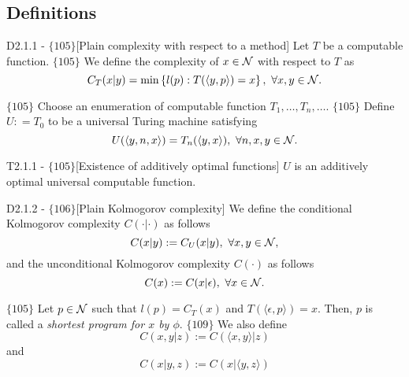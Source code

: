 \documentclass{article}
\begin{document}
\subsection{Definitions}

\begin{flexidefinition}{D2.1.1 - $\{105\}$}[Plain complexity with respect to a method]
    Let $T$ be a computable function. $\{105\}$ We define the complexity of $x \in \mathcal{N}$ with respect to $T$ as
\begin{equation}
    C_T(x|y) = \min \left\{l(p) : T(\langle y, p \rangle) = x \right\},  \ \forall x,y \in \mathcal{N}.
\end{equation}
\end{flexidefinition}

$\{105\}$ Choose an enumeration of computable function $T_1, \ldots, T_n, \ldots$. $\{105\}$ Define $U: =T_0$ to be a universal Turing machine satisfying
\begin{equation}
    U(\langle y, n, x \rangle) = T_n(\langle y, x \rangle), \ \forall n,x,y \in \mathcal{N}. 
\end{equation}

\begin{flexitheorem}{T2.1.1 - $\{105\}$}[Existence of additively optimal functions]
    $U$ is an additively optimal universal computable function.
\end{flexitheorem}

\begin{flexidefinition}{D2.1.2 - $\{106\}$}[Plain Kolmogorov complexity]
    We define the conditional Kolmogorov complexity $C(\cdot | \cdot)$ as follows 
    \begin{equation}
        C(x|y) := C_U(x|y), \  \forall x,y \in \mathcal{N},
    \end{equation}
    and the unconditional Kolmogorov complexity $C(\cdot)$ as follows
    \begin{equation}
        C(x) := C(x|\epsilon),  \ \forall x \in \NN.
    \end{equation}
\end{flexidefinition}

$\{105\}$ Let $p \in \mathcal{N}$ such that $l(p) = C_T(x)$ and $T(\langle \epsilon, p \rangle) = x$. Then, $p$ is called a \textit{shortest program for $x$ by $\phi$}.
$\{109\}$ We also define
\begin{equation}
    C(x,y|z) := C(\langle x,y \rangle | z)
\end{equation}
and 
\begin{equation}
    C(x|y,z) := C(x |\langle y,z \rangle)
\end{equation}
\end{document}
